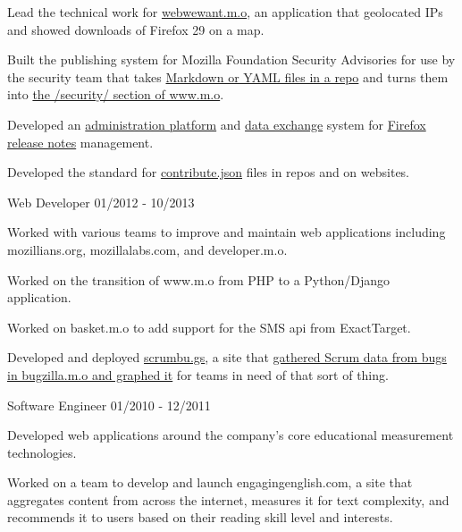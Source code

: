 \documentclass[11pt]{article} %
\begin{document}
\begin{description}
\item Lead the technical work for \href{https://blog.mozilla.org/webdev/2014/04/28/celebrating-the-web-we-want/}{webwewant.m.o},
an application that geolocated IPs and showed downloads of Firefox 29 on a map.

\item Built the publishing system for Mozilla Foundation Security Advisories for use by the security team that takes
\href{https://github.com/mozilla/foundation-security-advisories}{Markdown or YAML files in a repo} and turns them into
\href{https://www.mozilla.org/en-US/security/advisories/}{the /security/ section of www.m.o}.

\item Developed an \href{https://github.com/mozilla/nucleus/}{administration platform} and
\href{https://github.com/mozilla/release-notes/}{data exchange} system for
\href{https://www.mozilla.org/en-US/firefox/releases/}{Firefox release notes} management.

\item Developed the standard for \href{https://www.contributejson.org/}{contribute.json} files in repos and on websites.

           {Web Developer}
           {01/2012 - 10/2013}

\item Worked with various teams to improve and maintain web applications including mozillians.org, mozillalabs.com, and developer.m.o.

\item Worked on the transition of www.m.o from PHP to a Python/Django application.

\item Worked on basket.m.o to add support for the SMS api from ExactTarget.

\item Developed and deployed \href{https://github.com/mozilla/scrumbugz}{scrumbu.gs}, a site that
\href{https://blog.mozilla.org/webdev/2012/03/27/scrum-and-bugzilla/}{gathered Scrum data from bugs in bugzilla.m.o and graphed it} for teams in
need of that sort of thing.

           {Software Engineer}
           {01/2010 - 12/2011}

\item Developed web applications around the company's core educational measurement technologies.

\item Worked on a team to develop and launch engagingenglish.com, a site that aggregates content from across the internet,
measures it for text complexity, and recommends it to users based on their reading skill level and interests.


\end{description}
\end{document}
